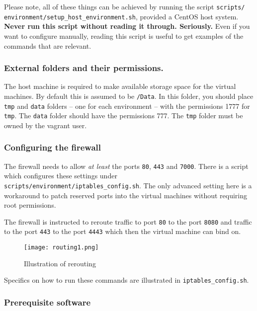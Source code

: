 Please note, all of these things can be achieved by running the script
\texttt{scripts/
environment/setup\_host\_environment.sh}, provided a
CentOS host system. \textbf{Never run this script without reading it
through. Seriously.} Even if you want to configure manually, reading
this script is useful to get examples of the commands that are relevant.

\subsubsection{External folders and their
permissions.}\label{external-folders-and-their-permissions.}

The host machine is required to make available storage space for the
virtual machines. By default this is assumed to be \texttt{/Data}. In
this folder, you should place \texttt{tmp} and \texttt{data} folders --
one for each environment -- with the permissions 1777 for \texttt{tmp}.
The \texttt{data} folder should have the permissions 777. The
\texttt{tmp} folder must be owned by the vagrant user.

\subsubsection{Configuring the firewall}\label{configuring-the-firewall}

The firewall needs to allow \emph{at least} the ports \texttt{80},
\texttt{443} and \texttt{7000}. There is a script which configures these
settings under \texttt{scripts/environment/iptables\_config.sh}. The
only advanced setting here is a workaround to patch reserved ports into
the virtual machines without requiring root permissions.

The firewall is instructed to reroute traffic to port \texttt{80} to the
port \texttt{8080} and traffic to the port \texttt{443} to the port
\texttt{4443} which then the virtual machine can bind on.

\begin{figure}[htbp]
\centering
\texttt{[image: routing1.png]}
\caption{Illustration of rerouting}
\end{figure}

Specifics on how to run these commands are illustrated in
\texttt{iptables\_config.sh}.

\subsubsection{Prerequisite software}\label{prerequisite-software}

